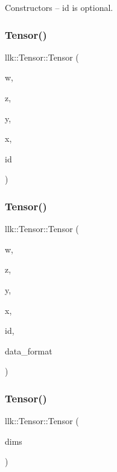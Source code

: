 Constructors -- id is optional. 

\mbox{\label{classllk_1_1Tensor_af67761de11995474009060754829083e}} 
\subsubsection{\texorpdfstring{Tensor()}{Tensor()}\hspace{0.1cm}{\footnotesize\ttfamily [2/8]}}
{\footnotesize\ttfamily llk\+::\+Tensor\+::\+Tensor (\begin{DoxyParamCaption}\item[{int}]{w,  }\item[{int}]{z,  }\item[{int}]{y,  }\item[{int}]{x,  }\item[{int}]{id }\end{DoxyParamCaption})}

\mbox{\label{classllk_1_1Tensor_a4966d01a028605d769148b46de392d91}} 
\subsubsection{\texorpdfstring{Tensor()}{Tensor()}\hspace{0.1cm}{\footnotesize\ttfamily [3/8]}}
{\footnotesize\ttfamily llk\+::\+Tensor\+::\+Tensor (\begin{DoxyParamCaption}\item[{int}]{w,  }\item[{int}]{z,  }\item[{int}]{y,  }\item[{int}]{x,  }\item[{int}]{id,  }\item[{Data\+Format}]{data\+\_\+format }\end{DoxyParamCaption})}

\mbox{\label{classllk_1_1Tensor_ad86bb1c93adc9b270b066d8760838f64}} 
\subsubsection{\texorpdfstring{Tensor()}{Tensor()}\hspace{0.1cm}{\footnotesize\ttfamily [4/8]}}
{\footnotesize\ttfamily llk\+::\+Tensor\+::\+Tensor (\begin{DoxyParamCaption}\item[{\hyperlink{structllk_1_1TensorDims}{Tensor\+Dims}}]{dims }\end{DoxyParamCaption})}

